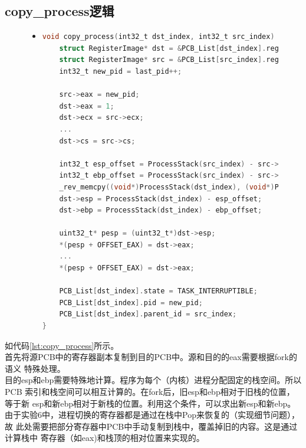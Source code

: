 \documentclass[a4paper]{article}
\begin{document}
    \subsection{copy_process逻辑}
    \begin{figure}
    \begin{itemize}
    \item[] \begin{lstlisting}[language=C, label=lst:copy_process, caption=copy_process的主要代码]
void copy_process(int32_t dst_index, int32_t src_index) {
    struct RegisterImage* dst = &PCB_List[dst_index].register_image;
    struct RegisterImage* src = &PCB_List[src_index].register_image; 
    int32_t new_pid = last_pid++;

    src->eax = new_pid;
    dst->eax = 1;
    dst->ecx = src->ecx;
    ...
    dst->cs = src->cs;

    int32_t esp_offset = ProcessStack(src_index) - src->esp;
    int32_t ebp_offset = ProcessStack(src_index) - src->ebp;
    _rev_memcpy((void*)ProcessStack(dst_index), (void*)ProcessStack(src_index), 1024);
    dst->esp = ProcessStack(dst_index) - esp_offset;
    dst->ebp = ProcessStack(dst_index) - ebp_offset;

    uint32_t* pesp = (uint32_t*)dst->esp;
    *(pesp + OFFSET_EAX) = dst->eax;
    ...
    *(pesp + OFFSET_EAX) = dst->eax;

    PCB_List[dst_index].state = TASK_INTERRUPTIBLE;
    PCB_List[dst_index].pid = new_pid;
    PCB_List[dst_index].parent_id = src_index;
}
    \end{lstlisting}
    \end{itemize}
    \end{figure}
    如代码\ref{lst:copy_process}所示。\\ 

    首先将源PCB中的寄存器副本复制到目的PCB中。源和目的的eax需要根据fork的语义
    特殊处理。\\ 

    目的esp和ebp需要特殊地计算。程序为每个（内核）进程分配固定的栈空间。所以PCB
    索引和栈空间可以相互计算的。在fork后，旧esp和ebp相对于旧栈的位置，等于新
    esp和新ebp相对于新栈的位置。利用这个条件，可以求出新esp和新ebp。\\ 

    由于实验6中，进程切换的寄存器都是通过在栈中Pop来恢复的（实现细节问题），故
    此处需要把部分寄存器中PCB中手动复制到栈中，覆盖掉旧的内容。这是通过计算栈中
    寄存器（如eax)和栈顶的相对位置来实现的。\\ 
\end{document}
